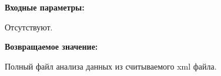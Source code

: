 \textbf{Входные параметры:}

Отсутствуют.

\textbf{Возвращаемое значение:}

Полный файл анализа данных из считываемого xml файла.